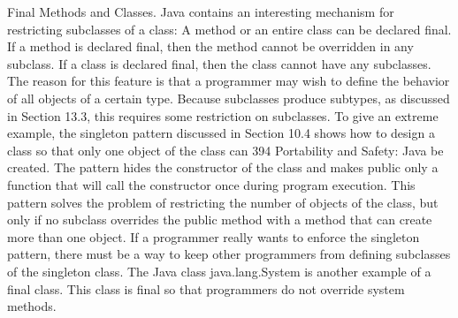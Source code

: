 \documentclass[a4paper,12pt]{report}
\begin{document}
	
	
    Final Methods and Classes. Java contains an interesting mechanism for restricting
	subclasses of a class: A method or an entire class can be declared final. If a method
	is declared final, then the method cannot be overridden in any subclass. If a class is
	declared final, then the class cannot have any subclasses. The reason for this feature
	is that a programmer may wish to define the behavior of all objects of a certain type.
	Because subclasses produce subtypes, as discussed in Section 13.3, this requires some
	restriction on subclasses. To give an extreme example, the singleton pattern discussed
	in Section 10.4 shows how to design a class so that only one object of the class can
	394 Portability and Safety: Java
	be created. The pattern hides the constructor of the class and makes public only a
	function that will call the constructor once during program execution. This pattern
	solves the problem of restricting the number of objects of the class, but only if no
	subclass overrides the public method with a method that can create more than one
	object. If a programmer really wants to enforce the singleton pattern, there must be
	a way to keep other programmers from defining subclasses of the singleton class.
	The Java class java.lang.System is another example of a final class. This class is
	final so that programmers do not override system methods.
	
	
	
	
	
	
	
	
	
	
	
	
	
	
	
	
	
\end{document}

